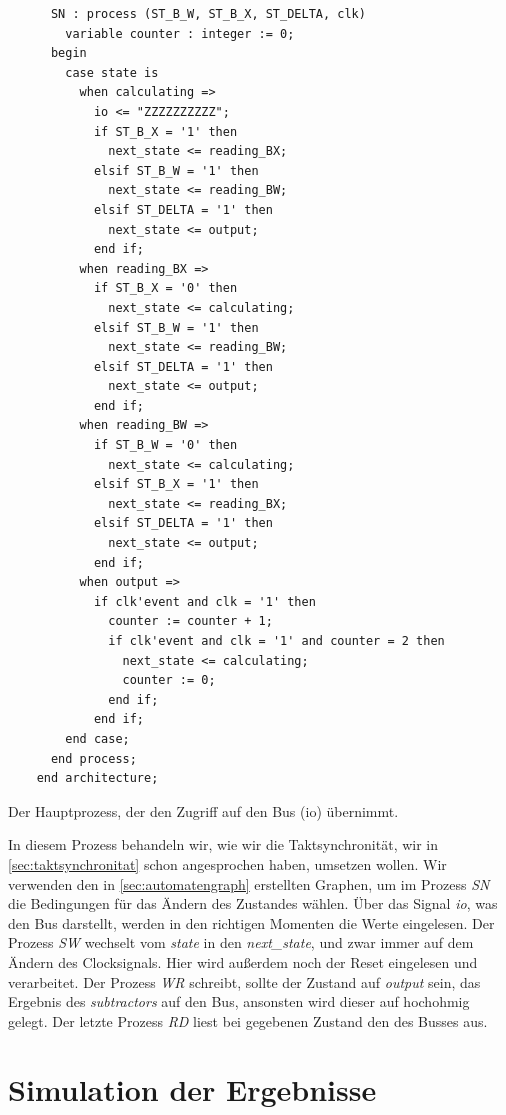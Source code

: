 \documentclass{report}
\newenvironment{longlisting}{\captionsetup{type=listing}}{}
\begin{document}
\begin{longlisting}
\begin{verbatim}
      SN : process (ST_B_W, ST_B_X, ST_DELTA, clk)
        variable counter : integer := 0;
      begin
        case state is
          when calculating =>
            io <= "ZZZZZZZZZZ";
            if ST_B_X = '1' then
              next_state <= reading_BX;
            elsif ST_B_W = '1' then
              next_state <= reading_BW;
            elsif ST_DELTA = '1' then
              next_state <= output;
            end if;
          when reading_BX =>
            if ST_B_X = '0' then
              next_state <= calculating;
            elsif ST_B_W = '1' then
              next_state <= reading_BW;
            elsif ST_DELTA = '1' then
              next_state <= output;
            end if;
          when reading_BW =>
            if ST_B_W = '0' then
              next_state <= calculating;
            elsif ST_B_X = '1' then
              next_state <= reading_BX;
            elsif ST_DELTA = '1' then
              next_state <= output;
            end if;
          when output =>
            if clk'event and clk = '1' then
              counter := counter + 1;
              if clk'event and clk = '1' and counter = 2 then
                next_state <= calculating;
                counter := 0;
              end if;
            end if;
        end case;
      end process;
    end architecture;
  \end{verbatim}
  \caption{Der Hauptprozess, der den Zugriff auf den Bus (io) übernimmt.}
  \label{code:comp}
\end{longlisting}

\noindent
In diesem Prozess behandeln wir, wie wir die Taktsynchronität, wir in \ref{sec:taktsynchronitat} schon angesprochen haben, umsetzen wollen. Wir verwenden den in \ref{sec:automatengraph} erstellten Graphen, um im Prozess \textit{SN} die Bedingungen für das Ändern des Zustandes wählen. Über das Signal \textit{io}, was den Bus darstellt, werden in den richtigen Momenten die Werte eingelesen. Der Prozess \textit{SW} wechselt vom \textit{state} in den \textit{next\_state}, und zwar immer auf dem Ändern des Clocksignals. Hier wird außerdem noch der Reset eingelesen und verarbeitet. Der Prozess \textit{WR} schreibt, sollte der Zustand auf \textit{output} sein, das Ergebnis des \textit{subtractors} auf den Bus, ansonsten wird dieser auf hochohmig gelegt. Der letzte Prozess \textit{RD} liest bei gegebenen Zustand den des Busses aus. 

\section{Simulation der Ergebnisse}
\label{sec:simul-der-ergebn-1}
\end{document}
